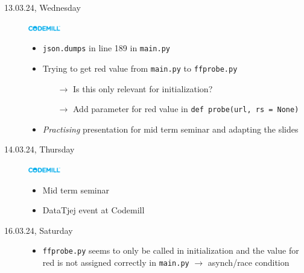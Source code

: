 \documentclass[a4, 11pt]{scrartcl}
\begin{document}
\begin{description}
	
	
	
		
	
	
	
	
	
	
	
	\item[13.03.24, Wednesday]
	\includegraphics[width=1.4cm]{codemill.png}
	\begin{itemize}
		\item \texttt{json.dumps} in line 189 in \texttt{main.py}
		\item Trying to get red value from \texttt{main.py} to \texttt{ffprobe.py}
		\begin{itemize}
			\item[$\rightarrow$] Is this only relevant for initialization?
			\item[$\rightarrow$] Add parameter for red value in \texttt{def probe(url, rs = None)}
		\end{itemize}
		\item \textit{Practising} presentation for mid term seminar and adapting the slides
	\end{itemize}



	
\item[14.03.24, Thursday]
\includegraphics[width=1.4cm]{codemill.png}
\begin{itemize}
	\item Mid term seminar
	\item DataTjej event at Codemill
\end{itemize}





	
\item[16.03.24, Saturday]
\begin{itemize}
	\item[]
	\item \texttt{ffprobe.py} seems to only be called in initialization and the value for red is not assigned correctly in \texttt{main.py} $\rightarrow$ asynch/race condition
\end{itemize}
	

\end{description}
\end{document}
